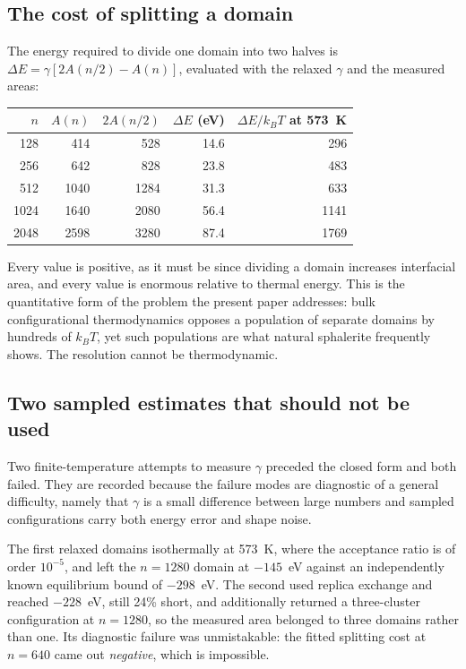 \documentclass[preprint,12pt,authoryear]{elsarticle}
\begin{document}
\subsection{The cost of splitting a domain}
\label{sec:splitting}

The energy required to divide one domain into two halves is
$\Delta E = \gamma\left[2A(n/2) - A(n)\right]$, evaluated with the relaxed
$\gamma$ and the measured areas:

\begin{center}
\small
\begin{tabular}{rrrrr}
\toprule
$n$ & $A(n)$ & $2A(n/2)$ & $\Delta E$ (eV) & $\Delta E / k_BT$ at 573~K \\
\midrule
128  & 414  & 528  & 14.6 & 296 \\
256  & 642  & 828  & 23.8 & 483 \\
512  & 1040 & 1284 & 31.3 & 633 \\
1024 & 1640 & 2080 & 56.4 & 1141 \\
2048 & 2598 & 3280 & 87.4 & 1769 \\
\bottomrule
\end{tabular}
\end{center}

Every value is positive, as it must be since dividing a domain increases
interfacial area, and every value is enormous relative to thermal energy. This
is the quantitative form of the problem the present paper addresses: bulk
configurational thermodynamics opposes a population of separate domains by
hundreds of $k_BT$, yet such populations are what natural sphalerite frequently
shows. The resolution cannot be thermodynamic.

\subsection{Two sampled estimates that should not be used}
\label{sec:gammafailed}

Two finite-temperature attempts to measure $\gamma$ preceded the closed form and
both failed. They are recorded because the failure modes are diagnostic of a
general difficulty, namely that $\gamma$ is a small difference between large
numbers and sampled configurations carry both energy error and shape noise.

The first relaxed domains isothermally at 573~K, where the acceptance ratio is
of order $10^{-5}$, and left the $n = 1280$ domain at $-145$~eV against an
independently known equilibrium bound of $-298$~eV. The second used replica
exchange and reached $-228$~eV, still 24\% short, and additionally returned a
three-cluster configuration at $n = 1280$, so the measured area belonged to
three domains rather than one. Its diagnostic failure was unmistakable: the
fitted splitting cost at $n = 640$ came out \emph{negative}, which is
impossible.
\end{document}
